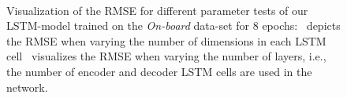 \begin{figure}[t!]
	\centering
    \\
    \caption{Visualization of the \ac{RMSE} for different parameter tests of our \ac{LSTM}-model trained on the \emph{On-board} data-set for \num{8} epochs:~\protect{} depicts the \ac{RMSE} when varying the number of dimensions in each \ac{LSTM} cell~\protect{} visualizes the \ac{RMSE} when varying the number of layers, i.e., the number of encoder and decoder \ac{LSTM} cells are used in the network.}
    \label{fig:lstm_units_layers_analysis}
\end{figure}

